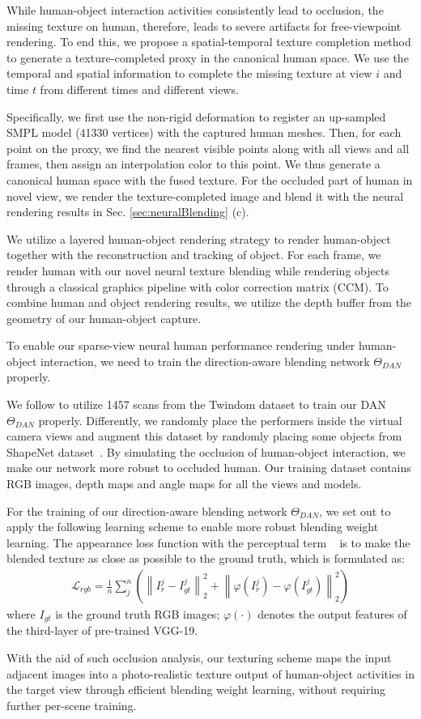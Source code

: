 %
While human-object interaction activities consistently lead to occlusion, the missing texture on human, therefore, leads to severe artifacts for free-viewpoint rendering.
%
To end this, we propose a spatial-temporal texture completion method to generate a texture-completed proxy in the canonical human space.
%
We use the temporal and spatial information to complete the missing texture at view $i$ and time $t$ from different times and different views.

Specifically, we first use the non-rigid deformation to register an up-sampled SMPL model (41330 vertices) with the captured human meshes.
%	
Then, for each point on the proxy, we find the nearest visible points along with all views and all frames, then assign an interpolation color to this point.
% 
We thus generate a canonical human space with the fused texture.
%
For the occluded part of human in novel view, we render the texture-completed image and blend it with the neural rendering results in Sec. \ref{sec:neuralBlending} (c).

We utilize a layered human-object rendering strategy to render human-object together with the reconstruction and tracking of object.
%
For each frame, we render human with our novel neural texture blending while rendering objects through a classical graphics pipeline with color correction matrix (CCM).
%
To combine human and object rendering results, we utilize the depth buffer from the geometry of our human-object capture.
%

 To enable our sparse-view neural human performance rendering under human-object interaction, we need to train the direction-aware blending network $\Theta_{DAN}$ properly.
% 

We follow \citet{NeuralHumanFVV2021CVPR} to utilize 1457 scans from the Twindom dataset \cite{Twindom} to train our DAN $\Theta_{DAN}$ properly.
%
Differently, we randomly place the performers inside the virtual camera views and augment this dataset by randomly placing some objects from ShapeNet dataset~\cite{chang2015shapenet}.
%
By simulating the occlusion of human-object interaction, we make our network more robust to occluded human.
%
Our training dataset contains RGB images, depth maps and angle maps for all the views and models.

For the training of our direction-aware blending network $\Theta_{DAN}$, we set out to apply the following learning scheme to enable more robust blending weight learning.
%
The appearance loss function with the perceptual term ~\cite{Johnson2016Perceptual} is to make the blended texture as close as possible to the ground truth, which is formulated as:
\begin{align}
	\left.\mathcal{L}_{r g b}=\frac{1}{n} \sum_{j}^{n}
	\left(
	\left\|I_{r}^{j}-I_{g t}^{j}\right\|_{2}^{2}
	+\left\|\varphi
	\left(
	I_{r}^{j}
	\right)
	-\varphi
	\left(
	I_{g t}^{j}
	\right)
	\right\|_{2}^{2}
	\right) \right.
\end{align}
where $I_{g t}$ is the ground truth RGB images; $\varphi(\cdot)$ denotes the output features of the third-layer of pre-trained VGG-19.

With the aid of such occlusion analysis, our texturing scheme maps the input adjacent images into a photo-realistic texture output of human-object activities in the target view through efficient blending weight learning, without requiring further per-scene training.
